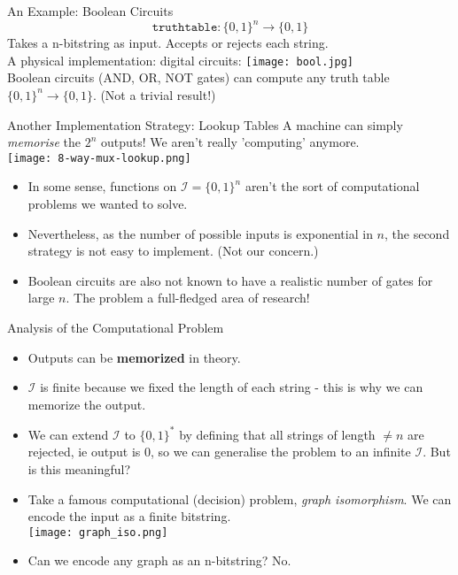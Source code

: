 \documentclass{beamer}
\begin{document}
\begin{frame}{An Example: Boolean Circuits}
\[ \mathtt{truth table} : \{0, 1 \}^n \rightarrow \{0, 1 \}\]
    Takes a n-bitstring as input. Accepts or rejects each string.
    \pause \\
    A physical implementation: digital circuits:
    \texttt{[image: bool.jpg]} \\
    Boolean circuits (AND, OR, NOT gates) can compute any truth table $\{0, 1\}^n \rightarrow \{0, 1\}$. (Not a trivial result!)
\end{frame}
\begin{frame}{Another Implementation Strategy: Lookup Tables}
    A machine can simply \emph{memorise} the $2^n$ outputs! We aren't really 'computing' anymore. \\
    \texttt{[image: 8-way-mux-lookup.png]}
    \pause \\
    \begin{itemize}
        \item     In some sense, functions on \( \mathcal{I} = \{0, 1 \}^n\) aren't the sort of computational problems we wanted to solve.\\ \pause
        \item Nevertheless, as the number of possible inputs is exponential in $n$, the second strategy is not easy to implement. (Not our concern.)
        \pause
        \item Boolean circuits are also not known to have a realistic number of gates for large $n$. The problem a full-fledged area of research!
    \end{itemize}
\end{frame}
\begin{frame}{Analysis of the Computational Problem}
\begin{itemize}
    \item Outputs can be \textbf{memorized} in theory.
    \item \(\mathcal{I}\) is finite because we fixed the length of each string - this is why we can memorize the output. \pause
    \item We can extend \(\mathcal{I}\) to \( \{0, 1 \}^*\) by defining that all strings of length \( \neq n\) are rejected, ie output is 0, so we can generalise the problem to an infinite \(\mathcal{I}\). But is this meaningful?
    \pause
    \item Take a famous computational (decision) problem, \emph{graph isomorphism}. We can encode the input as a finite bitstring. \\
    \texttt{[image: graph\_iso.png]}
    \pause 
    \item Can we encode any graph as an n-bitstring? No.
    \end{itemize}
\end{frame}
\end{document}

